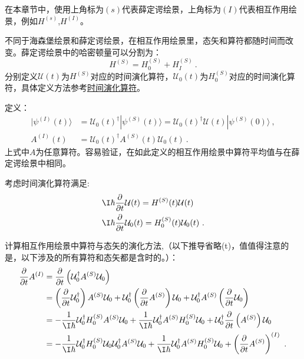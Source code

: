 
在本章节中，使用上角标为$(s)$代表薛定谔绘景，上角标为$(I)$代表相互作用绘景，例如$H^{(s)}$,$H^{(I)}$。

\begin{definition}{}

不同于海森堡绘景和薛定谔绘景，在相互作用绘景里，态矢和算符都随时间而改变。薛定谔绘景中的哈密顿量可以分割为：
\begin{equation}
H^{(S)}=H^{(S)}_0+H^{(S)}_I~.
\end{equation}
分别定义$\mathcal U(t)$为$H^{(S)}$对应的时间演化算符，$\mathcal U_0(t)$为$H^{(S)}_0$对应的时间演化算符，具体定义方法参考\href{https://wuli.wiki/online/TOprt.html}{时间演化算符}。

定义：
\begin{align}
|\psi^{(I)}(t)\rangle&=\mathcal U_0(t)^\dagger|\psi^{(S)}(t)\rangle=\mathcal U_0(t)^\dagger\mathcal U(t)|\psi^{(S)}(0)\rangle~, \\
A^{(I)}(t)&=\mathcal U_0(t)^\dagger A^{(S)}(t)\mathcal U_0 (t)~.
\end{align}
上式中$A$为任意算符。容易验证，在如此定义的相互作用绘景中算符平均值与在薛定谔绘景中相同。

\end{definition}

考虑时间演化算符满足:
\begin{align}
&\I\hbar\frac{\partial}{\partial t}\mathcal{U}(t) = H^{(S)}(t)\mathcal{U}(t) \\
&\I\hbar\frac{\partial}{\partial t}\mathcal{U}_0(t) = H^{(S)}_0(t)\mathcal{U}_0(t)~.
\end{align}

计算相互作用绘景中算符与态矢的演化方法,（以下推导省略(t)，值值得注意的是，以下涉及的所有算符和态矢都是含时的。）：
\begin{align}
\frac{\partial}{\partial t}A^{(I)}&=\frac{\partial}{\partial t}\left(\mathcal U_0^\dagger A^{(S)}\mathcal U_0 \right)\\
&=\left(\frac{\partial}{\partial t}\mathcal U_0^\dagger\right) A^{(S)}\mathcal U_0 +\mathcal U_0^\dagger \left(\frac{\partial}{\partial t}A^{(S)}\right)\mathcal U_0+\mathcal U_0^\dagger A^{(S)}\left(\frac{\partial}{\partial t}\mathcal U_0\right)\\
&=-\frac{1}{\I\hbar}\mathcal U_0^\dagger H^{(S)}_0A^{(S)}\mathcal U_0 +\frac{1}{\I\hbar}\mathcal U_0^\dagger A^{(S)}H^{(S)}_0\mathcal U_0+\mathcal U_0^\dagger \frac{\partial}{\partial t}\left(A^{(S)}\right)\mathcal U_0 \\
&=-\frac{1}{\I\hbar}\mathcal U_0^\dagger H^{(S)}_0 \mathcal U_0\mathcal U_0^\dagger A^{(S)}\mathcal U_0 +\frac{1}{\I\hbar}\mathcal U_0^\dagger A^{(S)}H^{(S)}_0\mathcal U_0+\left(\frac{\partial}{\partial t}A^{(S)}\right)^{(I)}~.
\end{align}



